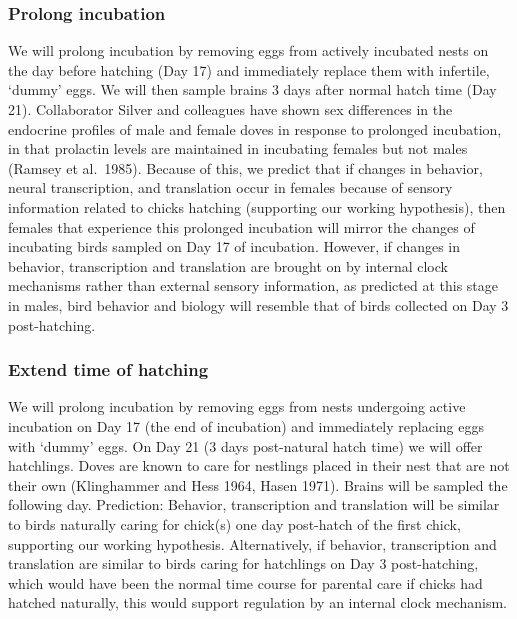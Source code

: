 \documentclass[10pt,letterpaper]{article}
\begin{document}
\hypertarget{prolong-incubation}{%
\subsubsection{Prolong incubation}\label{prolong-incubation}}

We will prolong incubation by removing eggs from actively incubated
nests on the day before hatching (Day 17) and immediately replace them
with infertile, `dummy' eggs. We will then sample brains 3 days after
normal hatch time (Day 21). Collaborator Silver and colleagues have
shown sex differences in the endocrine profiles of male and female doves
in response to prolonged incubation, in that prolactin levels are
maintained in incubating females but not males (Ramsey et al.~1985).
Because of this, we predict that if changes in behavior, neural
transcription, and translation occur in females because of sensory
information related to chicks hatching (supporting our working
hypothesis), then females that experience this prolonged incubation will
mirror the changes of incubating birds sampled on Day 17 of incubation.
However, if changes in behavior, transcription and translation are
brought on by internal clock mechanisms rather than external sensory
information, as predicted at this stage in males, bird behavior and
biology will resemble that of birds collected on Day 3 post-hatching.

\hypertarget{extend-time-of-hatching}{%
\subsubsection{Extend time of hatching}\label{extend-time-of-hatching}}

We will prolong incubation by removing eggs from nests undergoing active
incubation on Day 17 (the end of incubation) and immediately replacing
eggs with `dummy' eggs. On Day 21 (3 days post-natural hatch time) we
will offer hatchlings. Doves are known to care for nestlings placed in
their nest that are not their own (Klinghammer and Hess 1964, Hasen
1971). Brains will be sampled the following day. Prediction: Behavior,
transcription and translation will be similar to birds naturally caring
for chick(s) one day post-hatch of the first chick, supporting our
working hypothesis. Alternatively, if behavior, transcription and
translation are similar to birds caring for hatchlings on Day 3
post-hatching, which would have been the normal time course for parental
care if chicks had hatched naturally, this would support regulation by
an internal clock mechanism.
\end{document}
